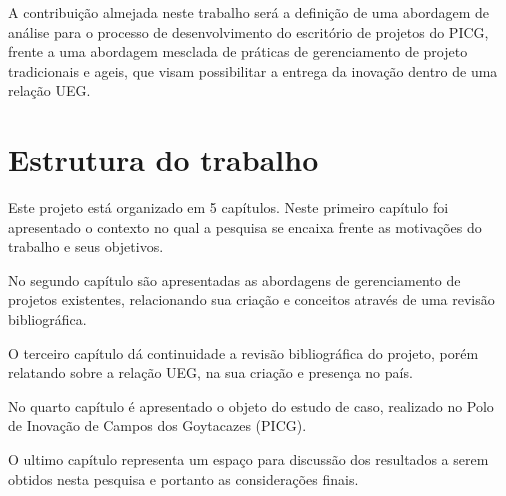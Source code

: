 A contribuição almejada neste trabalho será a definição de uma abordagem de análise para o processo de desenvolvimento do escritório de projetos do PICG, frente a uma abordagem mesclada de práticas de gerenciamento de projeto tradicionais e ageis, que visam possibilitar a entrega da inovação dentro de uma relação UEG.


\section{Estrutura do trabalho}

Este projeto está organizado em 5 capítulos. Neste primeiro capítulo foi apresentado o contexto no qual a pesquisa se encaixa frente as motivações do trabalho e seus objetivos.

No segundo capítulo são apresentadas as abordagens de gerenciamento de projetos existentes, relacionando sua criação e conceitos através de uma revisão bibliográfica.

O terceiro capítulo dá continuidade a revisão bibliográfica do projeto, porém relatando sobre a relação UEG, na sua criação e presença no país.

No quarto capítulo é apresentado o objeto do estudo de caso, realizado no Polo de Inovação de Campos dos Goytacazes (PICG).

O ultimo capítulo representa um espaço para discussão dos resultados a serem obtidos nesta pesquisa e portanto as considerações finais.

